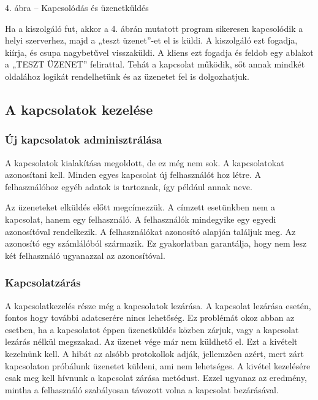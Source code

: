 \documentclass[]{article}
\begin{document}
4. ábra -- Kapcsolódás és üzenetküldés

Ha a kiszolgáló fut, akkor a 4. ábrán mutatott program sikeresen
kapcsolódik a helyi szerverhez, majd a „teszt üzenet''-et el is küldi. A
kiszolgáló ezt fogadja, kiírja, és csupa nagybetűvel visszaküldi. A
kliens ezt fogadja és feldob egy ablakot a „TESZT ÜZENET'' felirattal.
Tehát a kapcsolat működik, sőt annak mindkét oldalához logikát
rendelhetünk és az üzenetet fel is dolgozhatjuk.

\hypertarget{a-kapcsolatok-kezeluxe9se}{%
\subsection{A kapcsolatok kezelése}\label{a-kapcsolatok-kezeluxe9se}}

\hypertarget{uxfaj-kapcsolatok-adminisztruxe1luxe1sa}{%
\subsubsection{Új kapcsolatok
adminisztrálása}\label{uxfaj-kapcsolatok-adminisztruxe1luxe1sa}}

A kapcsolatok kialakítása megoldott, de ez még nem sok. A kapcsolatokat
azonosítani kell. Minden egyes kapcsolat új felhasználót hoz létre. A
felhasználóhoz egyéb adatok is tartoznak, így például annak neve.

Az üzeneteket elküldés előtt megcímezzük. A címzett esetünkben nem a
kapcsolat, hanem egy felhasználó. A felhasználók mindegyike egy egyedi
azonosítóval rendelkezik. A felhasználókat azonosító alapján találjuk
meg. Az azonosító egy számlálóból származik. Ez gyakorlatban garantálja,
hogy nem lesz két felhasználó ugyanazzal az azonosítóval.

\hypertarget{kapcsolatzuxe1ruxe1s}{%
\subsubsection{Kapcsolatzárás}\label{kapcsolatzuxe1ruxe1s}}

A kapcsolatkezelés része még a kapcsolatok lezárása. A kapcsolat
lezárása esetén, fontos hogy további adatcserére nincs lehetőség. Ez
problémát okoz abban az esetben, ha a kapcsolatot éppen üzenetküldés
közben zárjuk, vagy a kapcsolat lezárás nélkül megszakad. Az üzenet vége
már nem küldhető el. Ezt a kivételt kezelnünk kell. A hibát az alsóbb
protokollok adják, jellemzően azért, mert zárt kapcsolaton próbálunk
üzenetet küldeni, ami nem lehetséges. A kivétel kezelésére csak meg kell
hívnunk a kapcsolat zárása metódust. Ezzel ugyanaz az eredmény, mintha a
felhasználó szabályosan távozott volna a kapcsolat bezárásával.
\end{document}
